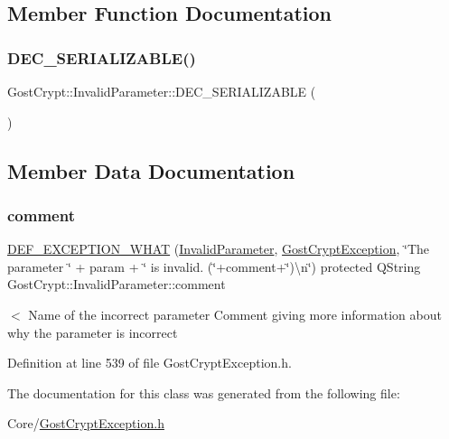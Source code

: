 \subsection{Member Function Documentation}
\mbox{\label{class_gost_crypt_1_1_invalid_parameter_ac8a96ce6bdbf800e1b649514a66195d0}} 
\subsubsection{\texorpdfstring{D\+E\+C\+\_\+\+S\+E\+R\+I\+A\+L\+I\+Z\+A\+B\+L\+E()}{DEC\_SERIALIZABLE()}}
{\footnotesize\ttfamily Gost\+Crypt\+::\+Invalid\+Parameter\+::\+D\+E\+C\+\_\+\+S\+E\+R\+I\+A\+L\+I\+Z\+A\+B\+LE (\begin{DoxyParamCaption}\item[{\hyperlink{class_gost_crypt_1_1_invalid_parameter}{Invalid\+Parameter}}]{ }\end{DoxyParamCaption})}



\subsection{Member Data Documentation}
\mbox{\label{class_gost_crypt_1_1_invalid_parameter_a14b79c4ad8724b8df63669bb2c2e7ed0}} 
\subsubsection{\texorpdfstring{comment}{comment}}
{\footnotesize\ttfamily \hyperlink{_gost_crypt_exception_8h_a5bc1e1c6c9d6f46c84eeba49e33355f9}{D\+E\+F\+\_\+\+E\+X\+C\+E\+P\+T\+I\+O\+N\+\_\+\+W\+H\+AT} (\hyperlink{class_gost_crypt_1_1_invalid_parameter}{Invalid\+Parameter}, \hyperlink{class_gost_crypt_1_1_gost_crypt_exception}{Gost\+Crypt\+Exception}, \char`\"{}The parameter \char`\"{} + param + \char`\"{} is invalid. (\char`\"{}+comment+\char`\"{})\textbackslash{}n\char`\"{}) protected Q\+String Gost\+Crypt\+::\+Invalid\+Parameter\+::comment}

$<$ Name of the incorrect parameter Comment giving more information about why the parameter is incorrect 

Definition at line 539 of file Gost\+Crypt\+Exception.\+h.



The documentation for this class was generated from the following file\+:\begin{DoxyCompactItemize}
\item 
Core/\hyperlink{_gost_crypt_exception_8h}{Gost\+Crypt\+Exception.\+h}\end{DoxyCompactItemize}
